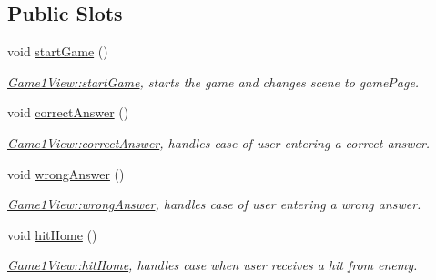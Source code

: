 \subsection*{Public Slots}
\begin{DoxyCompactItemize}
\item 
\mbox{\label{classGame1View_a8a96444a8609be01e432f594ef9d5278}} 
void \hyperlink{classGame1View_a8a96444a8609be01e432f594ef9d5278}{start\+Game} ()
\begin{DoxyCompactList}\small\item\em \hyperlink{classGame1View_a8a96444a8609be01e432f594ef9d5278}{Game1\+View\+::start\+Game}, starts the game and changes scene to game\+Page. \end{DoxyCompactList}\item 
\mbox{\label{classGame1View_a400e6a38b7059f5482af91c7526ecd81}} 
void \hyperlink{classGame1View_a400e6a38b7059f5482af91c7526ecd81}{correct\+Answer} ()
\begin{DoxyCompactList}\small\item\em \hyperlink{classGame1View_a400e6a38b7059f5482af91c7526ecd81}{Game1\+View\+::correct\+Answer}, handles case of user entering a correct answer. \end{DoxyCompactList}\item 
\mbox{\label{classGame1View_a3339f02c7248a8524ec46f1b3b51406c}} 
void \hyperlink{classGame1View_a3339f02c7248a8524ec46f1b3b51406c}{wrong\+Answer} ()
\begin{DoxyCompactList}\small\item\em \hyperlink{classGame1View_a3339f02c7248a8524ec46f1b3b51406c}{Game1\+View\+::wrong\+Answer}, handles case of user entering a wrong answer. \end{DoxyCompactList}\item 
\mbox{\label{classGame1View_ad9ad0551c9087ebe58db95e049b27300}} 
void \hyperlink{classGame1View_ad9ad0551c9087ebe58db95e049b27300}{hit\+Home} ()
\begin{DoxyCompactList}\small\item\em \hyperlink{classGame1View_ad9ad0551c9087ebe58db95e049b27300}{Game1\+View\+::hit\+Home}, handles case when user receives a hit from enemy. \end{DoxyCompactList}\item 

\end{DoxyCompactItemize}
